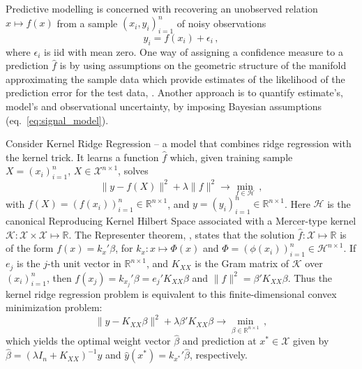 \documentclass[conference]{IEEEtran}
\newcommand{\Hcal}{\mathcal{H}}
\newcommand{\Kcal}{\mathcal{K}}
\newcommand{\Xcal}{\mathcal{X}}
\newcommand{\Real}{\mathbb{R}}
\begin{document}
Predictive modelling is concerned with recovering an unobserved relation $x\mapsto f(x)$
from a sample $(x_i, y_i)_{i=1}^n$ of noisy observations
\begin{equation} \label{eq:signal_model}
  y_i = f(x_i) + \epsilon_i \,,
\end{equation}
where $\epsilon_i$ is iid with mean zero. One way of assigning a confidence measure
to a prediction $\hat{f}$ is by using assumptions on the geometric structure of the
manifold approximating the sample data which provide estimates of the likelihood of
the prediction error for the test data, \cite{Bernstein2015,Kuleshov2016}. Another
approach is to quantify estimate's, model's and observational uncertainty, by imposing
Bayesian assumptions (eq.~\ref{eq:signal_model}).

Consider Kernel Ridge Regression -- a model that combines ridge regression with the
kernel trick. It learns a function $\hat{f}$ which, given training sample $X = (x_i)_{i=1}^n$,
$X\in \Xcal^{n\times 1}$, solves
\begin{equation*}
  \|y - f(X)\|^2 + \lambda \|f\|^2 \to \min_{f \in \Hcal} \,,
\end{equation*}
with $f(X) = (f(x_i))_{i=1}^n \in \Real^{n\times 1}$, and $y=(y_i)_{i=1}^n \in \Real^{n\times 1}$.
Here $\Hcal$ is the canonical Reproducing Kernel Hilbert Space associated with
a Mercer-type kernel $\Kcal:\Xcal\times \Xcal\mapsto \Real$. The Representer theorem,
\cite{scholkopf2002}, states that the solution $\hat{f}:\Xcal\mapsto\Real$ is of the
form $f(x) = k_x' \beta$, for $k_x : x\mapsto \Phi(x)$ and $\Phi = (\phi(x_i))_{i=1}^n \in \Hcal^{n\times 1}$.
If $e_j$ is the $j$-th unit vector in $\Real^{n\times 1}$, and $K_{XX}$ is the Gram
matrix of $\Kcal$ over $(x_i)_{i=1}^n$, then $f(x_j) = k_{x_j}' \beta = e_j' K_{XX} \beta$
and  $\| f \|^2 = \beta' K_{XX} \beta$. Thus the kernel ridge regression problem is
equivalent to this finite-dimensional convex minimization problem:
\begin{equation*}
  \|y - K_{XX} \beta \|^2 + \lambda \beta' K_{XX} \beta
    \to \min_{\beta\in \Real^{n\times 1}} \,,
\end{equation*}
which yields the optimal weight vector $\hat{\beta}$ and prediction at $x^*\in \Xcal$
given by $\hat{\beta} = (\lambda I_n + K_{XX})^{-1} y$ and $\hat{y}(x^*) = k_{x^*}'\hat{\beta}$,
respectively.
\end{document}
